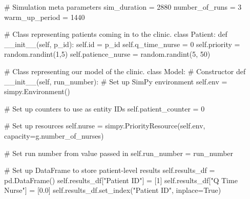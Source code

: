 \documentclass[
  letterpaper,
  DIV=11,
  numbers=noendperiod]{scrreprt}
\newenvironment{Shaded}{}{}
\newcommand{\BuiltInTok}[1]{\textcolor[rgb]{0.84,0.23,0.29}{#1}}
\newcommand{\CommentTok}[1]{\textcolor[rgb]{0.42,0.45,0.49}{#1}}
\newcommand{\DecValTok}[1]{\textcolor[rgb]{0.00,0.36,0.77}{#1}}
\newcommand{\FloatTok}[1]{\textcolor[rgb]{0.00,0.36,0.77}{#1}}
\newcommand{\FunctionTok}[1]{\textcolor[rgb]{0.44,0.26,0.76}{#1}}
\newcommand{\KeywordTok}[1]{\textcolor[rgb]{0.84,0.23,0.29}{#1}}
\newcommand{\NormalTok}[1]{\textcolor[rgb]{0.14,0.16,0.18}{#1}}
\newcommand{\OperatorTok}[1]{\textcolor[rgb]{0.14,0.16,0.18}{#1}}
\newcommand{\StringTok}[1]{\textcolor[rgb]{0.01,0.18,0.38}{#1}}
\newcommand{\VariableTok}[1]{\textcolor[rgb]{0.89,0.38,0.04}{#1}}
\begin{document}
\begin{tcolorbox}
\begin{Shaded}
\begin{Highlighting}[]
    \CommentTok{\# Simulation meta parameters}
\NormalTok{    sim\_duration }\OperatorTok{=} \DecValTok{2880}
\NormalTok{    number\_of\_runs }\OperatorTok{=} \DecValTok{3}
\NormalTok{    warm\_up\_period }\OperatorTok{=} \DecValTok{1440}

\CommentTok{\# Class representing patients coming in to the clinic.}
\KeywordTok{class}\NormalTok{ Patient:}
    \KeywordTok{def} \FunctionTok{\_\_init\_\_}\NormalTok{(}\VariableTok{self}\NormalTok{, p\_id):}
        \VariableTok{self}\NormalTok{.}\BuiltInTok{id} \OperatorTok{=}\NormalTok{ p\_id}
        \VariableTok{self}\NormalTok{.q\_time\_nurse }\OperatorTok{=} \DecValTok{0}
        \VariableTok{self}\NormalTok{.priority }\OperatorTok{=}\NormalTok{ random.randint(}\DecValTok{1}\NormalTok{,}\DecValTok{5}\NormalTok{)}
        \VariableTok{self}\NormalTok{.patience\_nurse }\OperatorTok{=}\NormalTok{ random.randint(}\DecValTok{5}\NormalTok{, }\DecValTok{50}\NormalTok{)}

\CommentTok{\# Class representing our model of the clinic.}
\KeywordTok{class}\NormalTok{ Model:}
    \CommentTok{\# Constructor}
    \KeywordTok{def} \FunctionTok{\_\_init\_\_}\NormalTok{(}\VariableTok{self}\NormalTok{, run\_number):}
        \CommentTok{\# Set up SimPy environment}
        \VariableTok{self}\NormalTok{.env }\OperatorTok{=}\NormalTok{ simpy.Environment()}

        \CommentTok{\# Set up counters to use as entity IDs}
        \VariableTok{self}\NormalTok{.patient\_counter }\OperatorTok{=} \DecValTok{0}

        \CommentTok{\# Set up resources}
        \VariableTok{self}\NormalTok{.nurse }\OperatorTok{=}\NormalTok{ simpy.PriorityResource(}\VariableTok{self}\NormalTok{.env,}
\NormalTok{                                            capacity}\OperatorTok{=}\NormalTok{g.number\_of\_nurses)}

        \CommentTok{\# Set run number from value passed in}
        \VariableTok{self}\NormalTok{.run\_number }\OperatorTok{=}\NormalTok{ run\_number}

        \CommentTok{\# Set up DataFrame to store patient{-}level results}
        \VariableTok{self}\NormalTok{.results\_df }\OperatorTok{=}\NormalTok{ pd.DataFrame()}
        \VariableTok{self}\NormalTok{.results\_df[}\StringTok{"Patient ID"}\NormalTok{] }\OperatorTok{=}\NormalTok{ [}\DecValTok{1}\NormalTok{]}
        \VariableTok{self}\NormalTok{.results\_df[}\StringTok{"Q Time Nurse"}\NormalTok{] }\OperatorTok{=}\NormalTok{ [}\FloatTok{0.0}\NormalTok{]}
        \VariableTok{self}\NormalTok{.results\_df.set\_index(}\StringTok{"Patient ID"}\NormalTok{, inplace}\OperatorTok{=}\VariableTok{True}\NormalTok{)}


\end{Highlighting}
\end{Shaded}
\end{tcolorbox}
\end{document}

